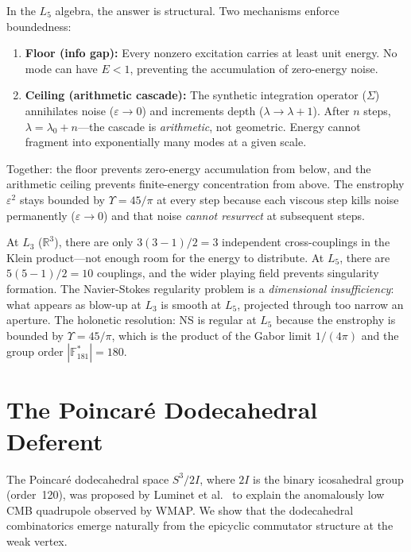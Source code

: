 \begin{remark}
In the $L_5$ algebra, the answer is structural. Two mechanisms enforce boundedness:
\begin{enumerate}[noitemsep]
    \item \textbf{Floor (info gap):} Every nonzero excitation carries at least unit energy. No mode can have $E < 1$, preventing the accumulation of zero-energy noise.
    \item \textbf{Ceiling (arithmetic cascade):} The synthetic integration operator ($\Sigma$) annihilates noise ($\varepsilon \to 0$) and increments depth ($\lambda \to \lambda + 1$). After $n$ steps, $\lambda = \lambda_0 + n$---the cascade is \emph{arithmetic}, not geometric. Energy cannot fragment into exponentially many modes at a given scale.
\end{enumerate}
Together: the floor prevents zero-energy accumulation from below, and the arithmetic ceiling prevents finite-energy concentration from above. The enstrophy $\varepsilon^2$ stays bounded by $\Upsilon = 45/\pi$ at every step because each viscous step kills noise permanently ($\varepsilon \to 0$) and that noise \emph{cannot resurrect} at subsequent steps.

At $L_3$ ($\mathbb{R}^3$), there are only $3(3-1)/2 = 3$ independent cross-couplings in the Klein product---not enough room for the energy to distribute. At $L_5$, there are $5(5-1)/2 = 10$ couplings, and the wider playing field prevents singularity formation. The Navier-Stokes regularity problem is a \emph{dimensional insufficiency}: what appears as blow-up at $L_3$ is smooth at $L_5$, projected through too narrow an aperture. The holonetic resolution: NS is regular at $L_5$ because the enstrophy is bounded by $\Upsilon = 45/\pi$, which is the product of the Gabor limit $1/(4\pi)$ and the group order $|\mathbb{F}_{181}^*| = 180$.
\end{remark}

\section{The Poincar\'{e} Dodecahedral Deferent}

The Poincar\'{e} dodecahedral space $S^3 / 2I$, where $2I$ is the binary icosahedral group (order~120), was proposed by Luminet et al.~\cite{luminet2003} to explain the anomalously low CMB quadrupole observed by WMAP. We show that the dodecahedral combinatorics emerge naturally from the epicyclic commutator structure at the weak vertex.


